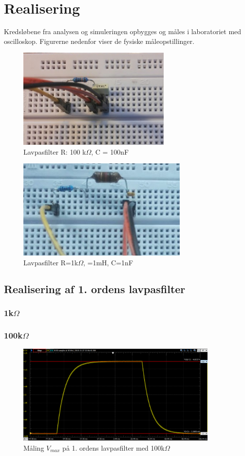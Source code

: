 \section{Realisering}
Kredsløbene fra analysen og simuleringen opbygges og måles i laboratoriet med oscilloskop. Figurerne nedenfor viser de fysiske måleopstillinger. 

\begin{figure}
\begin{center}
\includegraphics[height=5cm]{E_Fig/Rea_1_100}
\caption{Lavpasfilter R: 100 k$\Omega$, C = 100nF }
\label{Rea_1_100}
\end{center}
\end{figure}

\begin{figure}
\begin{center}
\includegraphics[height=5cm]{E_Fig/Rea_2_1}
\caption{Lavpasfilter R=1k$\Omega$, =1mH, C=1nF}
\label{Rea_2_1}
\end{center}
\end{figure}

\subsection{Realisering af 1. ordens lavpasfilter}

\subsubsection{1k$\Omega$}

\subsubsection{100k$\Omega$}

\begin{figure}
\begin{center}
\includegraphics[height=5cm]{E_Fig/Rea_1_100_max}
\caption{Måling $V_{max}$ på 1. ordens lavpasfilter med 100k$\Omega$}
\label{Rea_1_100_max}
\end{center}
\end{figure}
